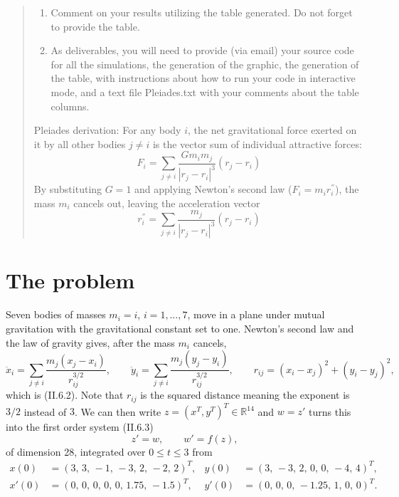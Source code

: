 \documentclass[11pt]{article}
\begin{document}
\begin{quote}
\begin{enumerate}
\item Comment on your results utilizing the table generated. Do not forget to
provide the table.

\item As deliverables, you will need to provide (via email) your source code for
all the simulations, the generation of the graphic, the generation of the table,
with instructions about how to run your code in interactive mode, and a text
file Pleiades.txt with your comments about the table columns.
\end{enumerate}

\medskip
Pleiades derivation: For any body $i$, the net gravitational force exerted on it
by all other bodies $j \neq i$ is the vector sum of individual attractive
forces:
\[
F_i = \sum_{j \neq i} \frac{G m_i m_j}{|r_j - r_i|^{3}} \left( r_j - r_i \right)
\]
By substituting $G = 1$ and applying Newton's second law
($F_i = m_i r_i^{''}$), the mass $m_i$ cancels out, leaving the acceleration
vector
\[
r_i^{''} = \sum_{j \neq i} \frac{m_j}{|r_j - r_i|^{3}} \left( r_j - r_i \right)
\]
\end{quote}


\section{The problem}

Seven bodies of masses $m_i = i$, $i = 1,\dots,7$, move in a plane under mutual
gravitation with the gravitational constant set to one. Newton's second law and
the law of gravity gives, after the mass $m_i$ cancels,
\begin{equation}
\ddot{x}_i = \sum_{j \neq i} \frac{m_j (x_j - x_i)}{r_{ij}^{3/2}},
\qquad
\ddot{y}_i = \sum_{j \neq i} \frac{m_j (y_j - y_i)}{r_{ij}^{3/2}},
\qquad
r_{ij} = (x_i - x_j)^2 + (y_i - y_j)^2 ,
\label{eq:accel}
\end{equation}
which is (II.6.2). Note that $r_{ij}$ is the squared distance meaning the
exponent is $3/2$ instead of $3$. We can then write $z = (x^{T}, y^{T})^{T} \in
\mathbb{R}^{14}$ and $w = z'$ turns this into the first order system (II.6.3)
\begin{equation}
z' = w, \qquad w' = f(z),
\label{eq:first-order}
\end{equation}
of dimension 28, integrated over $0 \le t \le 3$ from
\begin{align*}
x(0)  &= (3,\,3,\,-1,\,-3,\,2,\,-2,\,2)^{T}, &  y(0)  &= (3,\,-3,\,2,\,0,\,0,\,-4,\,4)^{T},\\
x'(0) &= (0,\,0,\,0,\,0,\,0,\,1.75,\,-1.5)^{T}, & y'(0) &= (0,\,0,\,0,\,-1.25,\,1,\,0,\,0)^{T}.
\end{align*}
\end{document}

